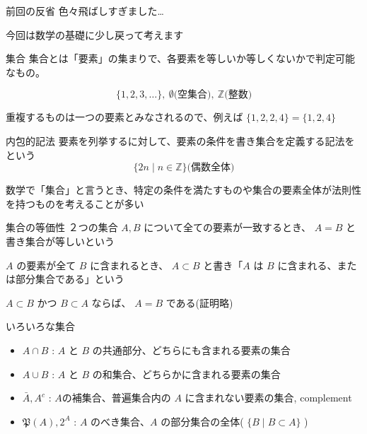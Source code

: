 \documentclass[dvipdfmx,12pt,a4paper,handout]{beamer}
\begin{document}
\begin{frame}{前回の反省}
 色々飛ばしすぎました…

 今回は数学の基礎に少し戻って考えます


\end{frame}

\begin{frame}{集合}
 集合とは「要素」の集まりで、各要素を等しいか等しくないかで判定可能なもの。

 \[
  \{1,2,3,\dots\},\ \emptyset\text{(空集合)},\ \mathbb{Z}\text{(整数)}
 \]

 重複するものは一つの要素とみなされるので、例えば $\{1,2,2,4\} = \{1,2,4\}$

 \begin{block}{内包的記法}
  要素を列挙するに対して、要素の条件を書き集合を定義する記法をという
  \[
  \{2n \mid n \in \mathbb{Z}\} \text{(偶数全体)}
  \]
 \end{block}

 数学で「集合」と言うとき、特定の条件を満たすものや集合の要素全体が法則性を持つものを考えることが多い

 \begin{block}{集合の等価性}
  ２つの集合 $A, B$ について全ての要素が一致するとき、 $A = B$ と書き集合が等しいという

  $A$ の要素が全て $B$ に含まれるとき、 $A \subset B$ と書き「$A$ は $B$ に含まれる、または部分集合である」という

  $A \subset B$ かつ $B \subset A$ ならば、 $A = B$ である(証明略)
 \end{block}

\end{frame}

\begin{frame}{いろいろな集合}
 \begin{itemize}
  \item $A \cap B$ : $A$ と $B$ の共通部分、どちらにも含まれる要素の集合
  \item $A \cup B$ : $A$ と $B$ の和集合、どちらかに含まれる要素の集合
  \item $\bar{A}, A^{c}$ : $A$の補集合、普遍集合内の $A$ に含まれない要素の集合, complement
  \item $\mathfrak{P}(A), 2^{A}$ : $A$ のべき集合、$A$ の部分集合の全体( $\{B \mid B \subset A\}$ )
 \end{itemize}
\end{frame}
\end{document}
